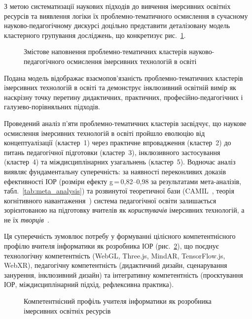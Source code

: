 
З метою систематизації наукових підходів до вивчення імерсивних освітніх ресурсів та виявлення логіки їх проблемно-тематичного осмислення в сучасному науково-педагогічному дискурсі доцільно представити деталізовану модель кластерного групування досліджень, що конкретизує рис.~\ref{fig:1.2}.

\begin{figure}[!h]
\centering

\caption{Змістове наповнення проблемно-тематичних кластерів науково-педагогічного осмислення імерсивних технологій в освіті}
\label{fig:1.2}
\end{figure}


Подана модель відображає взаємопов'язаність проблемно-тематичних кластерів імерсивних технологій в освіті та демонструє інклюзивний освітній вимір як наскрізну точку перетину дидактичних, практичних, професійно-педагогічних і галузево-порівняльних підходів.

Проведений аналіз п'яти проблемно-тематичних кластерів засвідчує, що наукове осмислення імерсивних технологій в освіті пройшло еволюцію від концептуалізації (кластер~1) через практичне впровадження (кластер~2) до питань педагогічної підготовки (кластер~3), інклюзивного застосування (кластер~4) та міждисциплінарних узагальнень (кластер~5). Водночас аналіз виявляє фундаментальну суперечність: за наявності переконливих доказів ефективності ІОР (розміри ефекту g\,=\,0{,}82--0{,}98 за результатами мета-аналізів, табл.~\ref{tab:meta_analysis}) та розвинутої теоретичної бази (CAMIL~\cite{Makransky2021CAMIL}, теорія когнітивного навантаження~\cite{Buchner2021CogLoad, Poupard2024Systematic}) система педагогічної освіти залишається зорієнтованою на підготовку вчителів як \emph{користувачів} імерсивних технологій, а не їх \emph{творців}~\cite{BeldaMedina2022TPACK}.

Ця суперечність зумовлює потребу у формуванні цілісного компетентнісного профілю вчителя інформатики як розробника ІОР (рис.~\ref{fig:competency_profile}), що поєднує технологічну компетентність (WebGL, Three.js, MindAR, TensorFlow.js, WebXR), педагогічну компетентність (дидактичний дизайн, сценарування занурення, інклюзивний дизайн) та інтегративну компетентність (проєктування ІОР, міждисциплінарний підхід, рефлексивна практика).

\begin{figure}[!h]
\centering

\caption{Компетентнісний профіль учителя інформатики як розробника імерсивних освітніх ресурсів}
\label{fig:competency_profile}
\end{figure}

